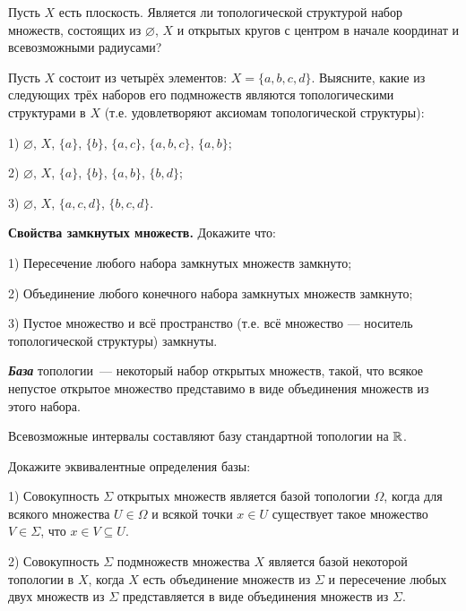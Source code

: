 \documentclass{article}
\begin{document}
    \begin{task_boxed}
        Пусть $X$ есть плоскость.
        Является ли топологической структурой набор множеств, состоящих из $\varnothing$, $X$ и открытых кругов с центром в начале координат и всевозможными радиусами?
    \end{task_boxed}

    \begin{task_boxed}
        Пусть $X$ состоит из четырёх элементов: $X=\{a, b, c, d\}$.
        Выясните, какие из следующих трёх наборов его подмножеств являются топологическими структурами в $X$ (т.е. удовлетворяют аксиомам топологической структуры):

        1) $\varnothing$, $X$, $\{a\}$, $\{b\}$, $\{a, c\}$, $\{a, b, c\}$, $\{a, b\}$;

        2) $\varnothing$, $X$, $\{a\}$, $\{b\}$, $\{a, b\}$, $\{b, d\}$;

        3) $\varnothing$, $X$, $\{a, c, d\}$, $\{b, c, d\}$.
    \end{task_boxed}

    \begin{task_boxed}
        \textbf{Свойства замкнутых множеств.}
        Докажите что:

        1) Пересечение любого набора замкнутых множеств замкнуто;

        2) Объединение любого конечного набора замкнутых множеств замкнуто;

        3) Пустое множество и всё пространство (т.е. всё множество — носитель топологической структуры) замкнуты.
    \end{task_boxed}


    \begin{definition_boxed}
        \textit{\textbf{База}} топологии~--- некоторый набор открытых множеств, такой, что всякое непустое открытое множество представимо в виде объединения множеств из этого набора.
    \end{definition_boxed}

    \begin{example}
        Всевозможные интервалы составляют базу стандартной топологии на $\mathbb{R}$.
    \end{example}

    \begin{task_boxed}
        Докажите эквивалентные определения базы:

        1) Совокупность $\Sigma$ открытых множеств является базой топологии $\Omega$, когда для всякого множества $U \in \Omega$ и всякой точки $x \in U$ существует такое множество $V \in \Sigma$, что $x \in V \subseteq U$.

        2) Совокупность $\Sigma$ подмножеств множества $X$ является базой некоторой топологии в $X$, когда $X$ есть объединение множеств из $\Sigma$ и пересечение любых двух множеств из $\Sigma$ представляется в виде объединения множеств из $\Sigma$.
    \end{task_boxed}
\end{document}
